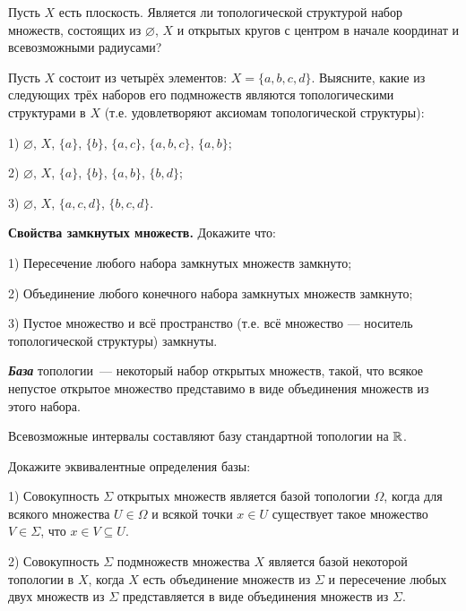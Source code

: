 \documentclass{article}
\begin{document}
    \begin{task_boxed}
        Пусть $X$ есть плоскость.
        Является ли топологической структурой набор множеств, состоящих из $\varnothing$, $X$ и открытых кругов с центром в начале координат и всевозможными радиусами?
    \end{task_boxed}

    \begin{task_boxed}
        Пусть $X$ состоит из четырёх элементов: $X=\{a, b, c, d\}$.
        Выясните, какие из следующих трёх наборов его подмножеств являются топологическими структурами в $X$ (т.е. удовлетворяют аксиомам топологической структуры):

        1) $\varnothing$, $X$, $\{a\}$, $\{b\}$, $\{a, c\}$, $\{a, b, c\}$, $\{a, b\}$;

        2) $\varnothing$, $X$, $\{a\}$, $\{b\}$, $\{a, b\}$, $\{b, d\}$;

        3) $\varnothing$, $X$, $\{a, c, d\}$, $\{b, c, d\}$.
    \end{task_boxed}

    \begin{task_boxed}
        \textbf{Свойства замкнутых множеств.}
        Докажите что:

        1) Пересечение любого набора замкнутых множеств замкнуто;

        2) Объединение любого конечного набора замкнутых множеств замкнуто;

        3) Пустое множество и всё пространство (т.е. всё множество — носитель топологической структуры) замкнуты.
    \end{task_boxed}


    \begin{definition_boxed}
        \textit{\textbf{База}} топологии~--- некоторый набор открытых множеств, такой, что всякое непустое открытое множество представимо в виде объединения множеств из этого набора.
    \end{definition_boxed}

    \begin{example}
        Всевозможные интервалы составляют базу стандартной топологии на $\mathbb{R}$.
    \end{example}

    \begin{task_boxed}
        Докажите эквивалентные определения базы:

        1) Совокупность $\Sigma$ открытых множеств является базой топологии $\Omega$, когда для всякого множества $U \in \Omega$ и всякой точки $x \in U$ существует такое множество $V \in \Sigma$, что $x \in V \subseteq U$.

        2) Совокупность $\Sigma$ подмножеств множества $X$ является базой некоторой топологии в $X$, когда $X$ есть объединение множеств из $\Sigma$ и пересечение любых двух множеств из $\Sigma$ представляется в виде объединения множеств из $\Sigma$.
    \end{task_boxed}
\end{document}
